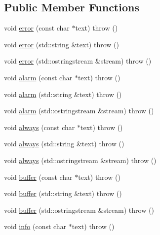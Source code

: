 \subsection*{Public Member Functions}
\begin{DoxyCompactItemize}
\item 
void \mbox{\hyperlink{class_c_plus_plus_logging_1_1_logger_a5982b50e18bde8da5d0c6bb056389a87}{error}} (const char $\ast$text)  throw ()
\item 
void \mbox{\hyperlink{class_c_plus_plus_logging_1_1_logger_abc3201b478e74ab4dac5d4c5fca371de}{error}} (std\+::string \&text)  throw ()
\item 
void \mbox{\hyperlink{class_c_plus_plus_logging_1_1_logger_a9429b8839590094a3561c84b9682470f}{error}} (std\+::ostringstream \&stream)  throw ()
\item 
void \mbox{\hyperlink{class_c_plus_plus_logging_1_1_logger_abb911553b778c25306f96339933a37f7}{alarm}} (const char $\ast$text)  throw ()
\item 
void \mbox{\hyperlink{class_c_plus_plus_logging_1_1_logger_a5a2ff4389559179f8b6c26d2b7bfa3eb}{alarm}} (std\+::string \&text)  throw ()
\item 
void \mbox{\hyperlink{class_c_plus_plus_logging_1_1_logger_acdafd9f7fdd91aa5e0d3ca1e3b219092}{alarm}} (std\+::ostringstream \&stream)  throw ()
\item 
void \mbox{\hyperlink{class_c_plus_plus_logging_1_1_logger_a0c982b36344b8794a25765e114a489d1}{always}} (const char $\ast$text)  throw ()
\item 
void \mbox{\hyperlink{class_c_plus_plus_logging_1_1_logger_af94d592fa00efb0bce52c886dda19dc1}{always}} (std\+::string \&text)  throw ()
\item 
void \mbox{\hyperlink{class_c_plus_plus_logging_1_1_logger_abe52aa21b7b644cd0a12dc1c706ebe23}{always}} (std\+::ostringstream \&stream)  throw ()
\item 
void \mbox{\hyperlink{class_c_plus_plus_logging_1_1_logger_aa0b3b553c9143e176334e785ae837300}{buffer}} (const char $\ast$text)  throw ()
\item 
void \mbox{\hyperlink{class_c_plus_plus_logging_1_1_logger_ad34841622784b243513befe62c10559a}{buffer}} (std\+::string \&text)  throw ()
\item 
void \mbox{\hyperlink{class_c_plus_plus_logging_1_1_logger_adf30b9c34f74676e6d916b9afb86a49b}{buffer}} (std\+::ostringstream \&stream)  throw ()
\item 
void \mbox{\hyperlink{class_c_plus_plus_logging_1_1_logger_a2eda79a040ab5f3e4c882ae2a8bc48bd}{info}} (const char $\ast$text)  throw ()

\end{DoxyCompactItemize}

